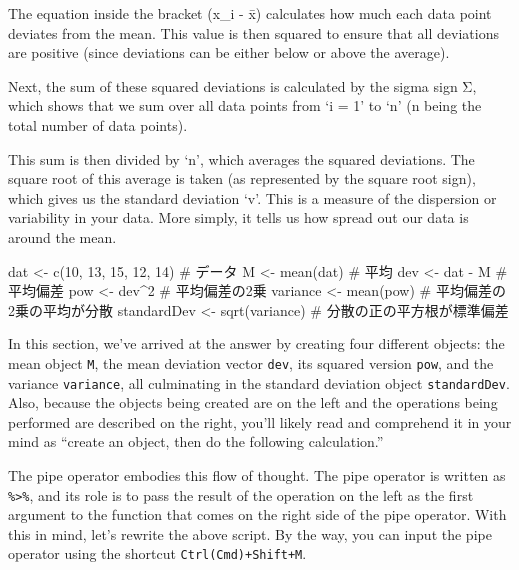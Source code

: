 \documentclass[
  a4paper,
]{book}
\newenvironment{Shaded}{\begin{snugshade}}{\end{snugshade}}
\newcommand{\CommentTok}[1]{\textcolor[rgb]{0.37,0.37,0.37}{#1}}
\newcommand{\DecValTok}[1]{\textcolor[rgb]{0.68,0.00,0.00}{#1}}
\newcommand{\FunctionTok}[1]{\textcolor[rgb]{0.28,0.35,0.67}{#1}}
\newcommand{\NormalTok}[1]{\textcolor[rgb]{0.00,0.23,0.31}{#1}}
\newcommand{\OtherTok}[1]{\textcolor[rgb]{0.00,0.23,0.31}{#1}}
\newcommand{\SpecialCharTok}[1]{\textcolor[rgb]{0.37,0.37,0.37}{#1}}
\begin{document}
The equation inside the bracket (x\_i - x̄) calculates how much each data
point deviates from the mean. This value is then squared to ensure that
all deviations are positive (since deviations can be either below or
above the average).

Next, the sum of these squared deviations is calculated by the sigma
sign Σ, which shows that we sum over all data points from `i = 1' to `n'
(n being the total number of data points).

This sum is then divided by `n', which averages the squared deviations.
The square root of this average is taken (as represented by the square
root sign), which gives us the standard deviation `v'. This is a measure
of the dispersion or variability in your data. More simply, it tells us
how spread out our data is around the mean.

\begin{Shaded}
\begin{Highlighting}[]
\NormalTok{dat }\OtherTok{\textless{}{-}} \FunctionTok{c}\NormalTok{(}\DecValTok{10}\NormalTok{, }\DecValTok{13}\NormalTok{, }\DecValTok{15}\NormalTok{, }\DecValTok{12}\NormalTok{, }\DecValTok{14}\NormalTok{) }\CommentTok{\# データ}
\NormalTok{M }\OtherTok{\textless{}{-}} \FunctionTok{mean}\NormalTok{(dat) }\CommentTok{\# 平均}
\NormalTok{dev }\OtherTok{\textless{}{-}}\NormalTok{ dat }\SpecialCharTok{{-}}\NormalTok{ M }\CommentTok{\# 平均偏差}
\NormalTok{pow }\OtherTok{\textless{}{-}}\NormalTok{ dev}\SpecialCharTok{\^{}}\DecValTok{2} \CommentTok{\# 平均偏差の2乗}
\NormalTok{variance }\OtherTok{\textless{}{-}} \FunctionTok{mean}\NormalTok{(pow) }\CommentTok{\# 平均偏差の2乗の平均が分散}
\NormalTok{standardDev }\OtherTok{\textless{}{-}} \FunctionTok{sqrt}\NormalTok{(variance) }\CommentTok{\# 分散の正の平方根が標準偏差}
\end{Highlighting}
\end{Shaded}

In this section, we've arrived at the answer by creating four different
objects: the mean object \texttt{M}, the mean deviation vector
\texttt{dev}, its squared version \texttt{pow}, and the variance
\texttt{variance}, all culminating in the standard deviation object
\texttt{standardDev}. Also, because the objects being created are on the
left and the operations being performed are described on the right,
you'll likely read and comprehend it in your mind as ``create an object,
then do the following calculation.''

The pipe operator embodies this flow of thought. The pipe operator is
written as \texttt{\%\textgreater{}\%}, and its role is to pass the
result of the operation on the left as the first argument to the
function that comes on the right side of the pipe operator. With this in
mind, let's rewrite the above script. By the way, you can input the pipe
operator using the shortcut \texttt{Ctrl(Cmd)+Shift+M}.
\end{document}
